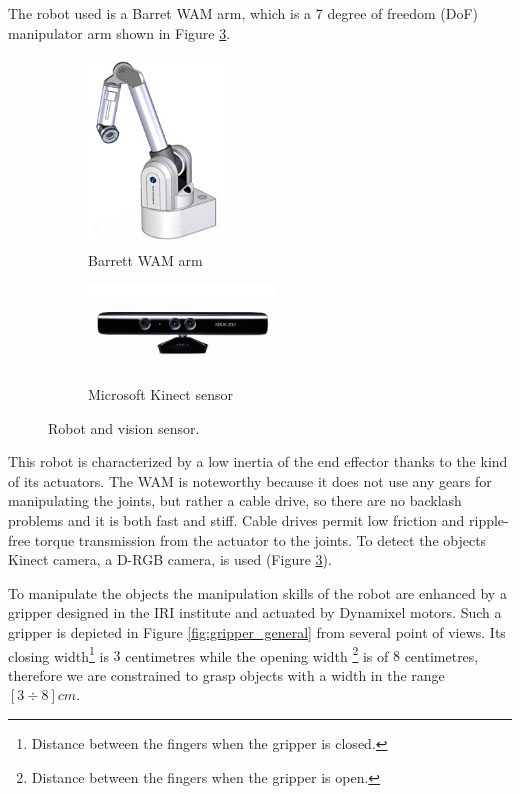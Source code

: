 The robot used is a Barret WAM arm, which is a 7 degree of freedom (DoF) manipulator arm shown in Figure \ref{fig:wam_1}. 
\begin{figure}[htp]
\centering
\begin{subfigure}[b]{0.45\textwidth}
\centering
\includegraphics[height=5cm]{Img/set_up/wam.jpg}
\caption{Barrett WAM arm}\label{fig:wam_1}
\end{subfigure}
\begin{subfigure}[b]{0.45\textwidth}
\centering
\includegraphics[width=5cm]{Img/set_up/Kinect.jpg}
\caption{Microsoft Kinect sensor}\label{fig:wam_1}
\end{subfigure}
\caption{Robot and vision sensor.}
\end{figure}
This robot is characterized by a low inertia of the end effector thanks to the kind of its actuators. The WAM is noteworthy because it does not use any gears for manipulating the joints, but rather a cable drive, so there are no backlash problems and it is both fast and stiff. Cable drives permit low friction and ripple-free torque transmission from the actuator to the joints. 
To detect the objects Kinect camera, a D-RGB camera, is used (Figure \ref{fig:wam_1}).

To manipulate the objects the manipulation skills of the robot are enhanced by a gripper designed in the IRI institute and actuated by Dynamixel motors. Such a gripper is depicted in Figure \ref{fig:gripper_general} from several point of views. Its closing width\footnote{Distance between the fingers when the gripper is closed.} is $3$ centimetres while the opening width \footnote{Distance between the fingers when the gripper is open.} is of $8$ centimetres, therefore we are constrained to grasp objects with a width in the range $[3 \div 8]cm$.

